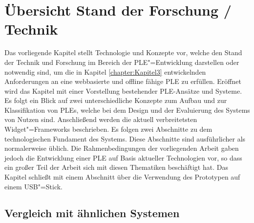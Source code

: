 \chapter{Übersicht Stand der Forschung / Technik}\label{chapter:Kapitel4}

Das vorliegende Kapitel stellt Technologie und Konzepte vor, welche den Stand der Technik und Forschung im Bereich der \ac{PLE}"=Entwicklung darstellen oder notwendig sind, um die in Kapitel \ref{chapter:Kapitel3} entwickelnden Anforderungen an eine webbasierte und offline fähige \ac{PLE} zu erfüllen. Eröffnet wird das Kapitel mit einer Vorstellung bestehender \ac{PLE}-Ansätze und Systeme. Es folgt ein Blick auf zwei unterschiedliche Konzepte zum Aufbau und zur Klassifikation von \acp{PLE}, welche bei dem Design und der Evaluierung des Systems von Nutzen sind. Anschließend werden die aktuell verbreitetsten Widget"=Frameworks beschrieben. Es folgen zwei Abschnitte zu dem technologischen Fundament des Systems. Diese Abschnitte sind ausführlicher als normalerweise üblich. Die Rahmenbedingungen der vorliegenden Arbeit gaben jedoch die Entwicklung einer \ac{PLE} auf Basis aktueller Technologien vor, so dass ein großer Teil der Arbeit sich mit diesen Thematiken beschäftigt hat. Das Kapitel schließt mit einem Abschnitt über die Verwendung des Prototypen auf einem USB"=Stick. 

\section{Vergleich mit ähnlichen Systemen}\label{section:aehnliche_systeme}

